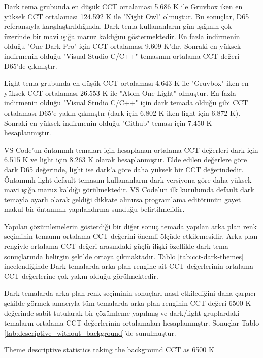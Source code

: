 \documentclass{article}
\begin{document}
Dark tema grubunda en düşük CCT ortalaması 5.686 K ile Gruvbox iken en yüksek CCT ortalaması 124.592 K ile "Night Owl"
olmuştur. Bu sonuçlar, D65 referansıyla karşılaştırıldığında, Dark tema kullananların gün ışığının çok üzerinde bir mavi
ışığa maruz kaldığını göstermektedir. En fazla indirmenin olduğu "One Dark Pro" için CCT ortalaması 9.609 K'dır. Sonraki
en yüksek indirmenin olduğu "Visual Studio C/C++" temasının ortalama CCT değeri D65'de çıkmıştır.

Light tema grubunda en düşük CCT ortalaması 4.643 K ile "Gruvbox" iken en yüksek CCT ortalaması 26.553 K ile "Atom One
Light" olmuştur. En fazla indirmenin olduğu "Visual Studio C/C++" için dark temada olduğu gibi CCT ortalaması D65'e yakın
çıkmıştır (dark için 6.802 K iken light için 6.872 K). Sonraki en yüksek indirmenin olduğu "Github" teması için 7.450 K
hesaplanmıştır.

VS Code'un öntanımlı temaları için hesaplanan ortalama CCT değerleri dark için 6.515 K ve light için 8.263 K olarak
hesaplanmıştır. Elde edilen değerlere göre dark D65 değerinde, light ise dark'a göre daha yüksek bir CCT değerindedir.
Öntanımlı light default temasını kullananların dark versiyona göre daha yüksek mavi ışığa maruz kaldığı görülmektedir.
VS Code'un ilk kurulumda default dark temayla ayarlı olarak geldiği dikkate alınırsa programlama editörünün gayet makul
bir öntanımlı yapılandırma sunduğu belirtilmelidir.

Yapılan çözümlemelerin gösterdiği bir diğer sonuç temada yapılan arka plan renk seçiminin temanın ortalama CCT değerini
önemli ölçüde etkilemesidir. Arka plan rengiyle ortalama CCT değeri arasındaki güçlü ilişki özellikle dark tema
sonuçlarında belirgin şekilde ortaya çıkmaktadır.  Tablo \ref{tab:cct-dark-themes} incelendiğinde Dark temalarda arka
plan rengine ait CCT değerlerinin ortalama CCT değerlerine çok yakın olduğu görülmektedir.

Dark temalarda arka plan renk seçiminin sonuçları nasıl etkilediğini daha çarpıcı şekilde görmek amacıyla tüm temalarda
arka plan renginin CCT değeri 6500 K değerinde sabit tutularak bir çözümleme yapılmış ve dark/light gruplardaki
temaların ortalama CCT değerlerinin ortalamaları hesaplanmıştır.  Sonuçlar Tablo
\ref{tab:descriptive_without_background}'de sunulmuştur.

\begin{table}[H]

	\caption{Theme descriptive statistics taking the background CCT as 6500 K}
	\label{tab:descriptive_without_background}
\end{table}
\end{document}
